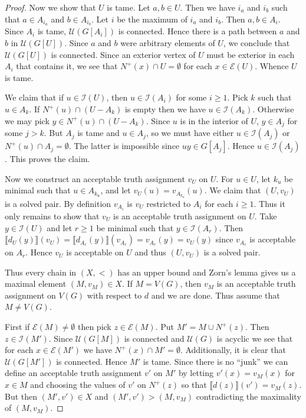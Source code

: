 \documentclass[12pt]{kluwer}
\theoremstyle{remark}
\newcommand{\fancy}[1]{\mathcal{#1}}
\def\I{\fancy{I}}
\def\U{\fancy{U}}
\def\E{\fancy{E}}
\begin{document}
\begin{proof}
Now we show that $U$ is tame.  Let $a, b \in U$. Then we have $i_a$ and $i_b$ such that $a \in A_{i_a}$ and $b \in A_{i_b}$. Let $i$ be the maximum of $i_a$ and $i_b$.  Then $a,b \in A_i$.  Since $A_i$ is tame, $\U(G[A_i])$ is connected.  Hence there is a path between $a$ and $b$ in $\U(G[U])$.  Since $a$ and $b$ were arbitrary elements of $U$, we conclude that $\U(G[U])$ is connected. Since an exterior vertex of $U$ must be exterior in each $A_i$ that contains it, we see that $N^+(x) \cap U = \emptyset$ for each $x \in \E(U)$.  Whence $U$ is tame.

We claim that if $u \in \I(U)$, then $u \in \I(A_i)$ for some $i \geq 1$.  Pick $k$ such that $u \in A_k$.  If $N^+(u) \cap \left(U - A_k\right)$ is empty then we have $u \in \I(A_k)$. Otherwise we may pick $y \in N^+(u) \cap \left(U - A_k\right)$.  Since $u$ is in the interior of $U$, $y \in A_j$ for some $j > k$.  But $A_j$ is tame and $u \in A_j$, so we must have either $u \in \I(A_j)$ or $N^+(u) \cap A_j = \emptyset$. The latter is impossible since $uy \in G[A_j]$.  Hence $u \in \I(A_j)$. This proves the claim.

Now we construct an acceptable truth assignment $v_U$ on $U$.  For $u \in U$, let $k_u$ be minimal such that $u \in A_{k_u}$, and let $v_U(u) = v_{A_{k_u}}(u)$. We claim that $(U, v_U)$ is a solved pair.  By definition $v_{A_i}$ is $v_U$ restricted to $A_i$ for each $i \geq 1$.  Thus it only remains to show that $v_U$ is an acceptable truth assignment on $U$.  Take $y \in \I(U)$ and let $r \geq 1$ be minimal such that $y \in \I(A_r)$.  Then $\llbracket d_U(y) \rrbracket(v_U) = \llbracket d_{A_r}(y) \rrbracket(v_{A_r}) = v_{A_r}(y) = v_U(y)$ since $v_{A_r}$ is acceptable on $A_r$.  Hence $v_U$ is acceptable on $U$ and thus $(U, v_U)$ is a solved pair.

Thus every chain in $(X, <)$ has an upper bound and Zorn's lemma gives us a maximal element $(M, v_M) \in X$.  If $M = V(G)$, then $v_M$ is an acceptable truth assignment on $V(G)$ with respect to $d$ and we are done.  Thus assume that $M \neq V(G)$.

First if $\E(M) \neq \emptyset$ then pick $z \in \E(M)$.  Put $M' = M \cup N^+(z)$.  Then $z \in \I(M')$. Since $\U(G[M])$ is connected and $\U(G)$ is acyclic we see that for each $x \in \E(M')$ we have $N^+(x) \cap M' = \emptyset$.  Additionally, it is clear that $\U(G[M'])$ is connected.  Hence $M'$ is tame.  Since there is no ``junk'' we can define an acceptable truth assignment $v'$ on $M'$ by letting $v'(x) = v_M(x)$ for $x \in M$ and choosing the values of $v'$ on $N^+(z)$ so that $\llbracket d(z) \rrbracket(v') = v_M(z)$.  But then $(M', v') \in X$ and $(M', v') > (M, v_M)$ contradicting the maximality of $(M, v_M)$.


\end{proof}
\end{document}
